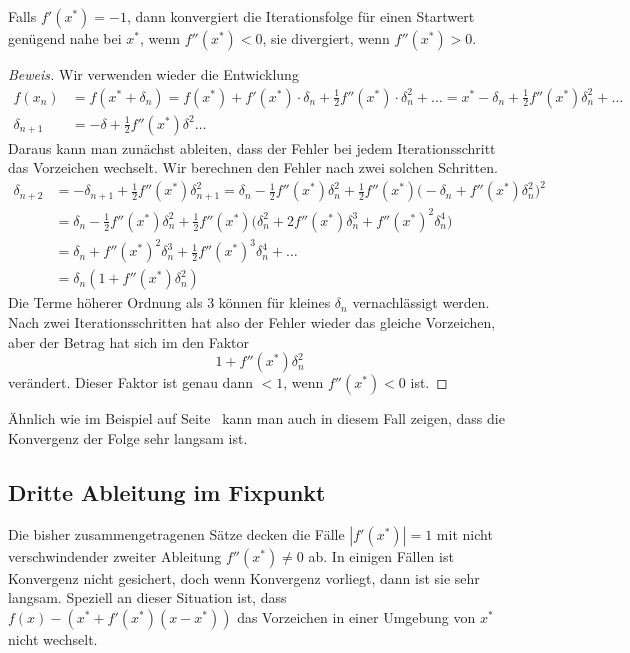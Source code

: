 \begin{satz}
Falls $f'(x^*)=-1$, dann konvergiert die Iterationsfolge für einen
Startwert genügend nahe bei $x^*$, wenn $f''(x^*) <0$, sie divergiert,
wenn $f''(x^*)>0$.
\end{satz}

\begin{proof}[Beweis]
Wir verwenden wieder die Entwicklung
\begin{align*}
f(x_n)
&=
f(x^* +\delta_n)
=
f(x^*) + f'(x^*) \cdot \delta_n + \frac12 f''(x^*)\cdot \delta_n^2
+ \dots
=
x^* - \delta_n + \frac12f''(x^*)\delta_n^2 +\dots
\\
\delta_{n+1}
&=
-\delta + \frac12f''(x^*)\delta^2 \dots
\end{align*}
Daraus kann man zunächst ableiten, dass der Fehler bei jedem 
Iterationsschritt das Vorzeichen wechselt.
Wir berechnen den Fehler nach zwei solchen Schritten.
\begin{align*}
\delta_{n+2}
&=
-\delta_{n+1} + \frac12f''(x^*) \delta_{n+1}^2
=
\delta_n - \frac12f''(x^*) \delta_n^2
+
\frac12 f''(x^*) \bigl(-\delta_n + f''(x^*)\delta_n^2\bigr)^2
\\
&=
\delta_n 
-\frac12 f''(x^*)
\delta_n^2
+\frac12 f''(x^*)
\bigl( \delta_n^2 + 2f''(x^*)\delta_n^3 + f''(x^*)^2\delta_n^4\bigr)
\\
&=
\delta_n
+
f''(x^*)^2\delta_n^3
+
\frac12f''(x^*)^3\delta_n^4
+\dots
\\
&=
\delta_n (1 + f''(x^*)\delta_n^2)
\end{align*}
Die Terme höherer Ordnung als $3$ können für kleines $\delta_n$ 
vernachlässigt werden.
Nach zwei Iterationsschritten hat also der Fehler wieder das gleiche
Vorzeichen, aber der Betrag hat sich im den Faktor
\[
1+f''(x^*)\delta_n^2
\]
verändert.
Dieser Faktor ist genau dann $<1$, wenn $f''(x^*)<0$ ist.
\end{proof}

Ähnlich wie im Beispiel auf 
Seite~\pageref{buch:beispiel:logistisch3} kann man auch in diesem
Fall zeigen, dass die Konvergenz der Folge sehr langsam ist.

%
%
\subsection{Dritte Ableitung im Fixpunkt
\label{buch:subsection:dritteableitungfixpunkt}}
%
%
%
Die bisher zusammengetragenen Sätze decken die Fälle $|f'(x^*)|=1$ mit
nicht verschwindender zweiter Ableitung $f''(x^*)\ne 0$ ab.
In einigen Fällen ist Konvergenz nicht gesichert, doch wenn Konvergenz
vorliegt, dann ist sie sehr langsam.
Speziell an dieser Situation ist, dass
$f(x)-(x^* + f'(x^*)(x-x^*))$
das Vorzeichen in einer Umgebung von $x^*$ nicht wechselt.


